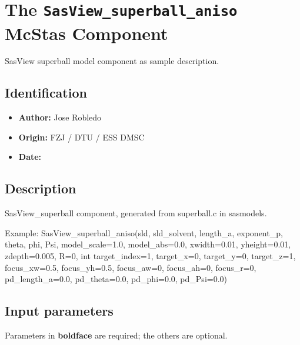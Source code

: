 \section{The \texttt{SasView\_superball\_aniso} McStas Component}
SasView superball model component as sample description.

\subsection*{Identification}
\begin{itemize}
  \item \textbf{Author:} Jose Robledo
  \item \textbf{Origin:} FZJ / DTU / ESS DMSC
  \item \textbf{Date:} 
\end{itemize}

\subsection*{Description}
SasView\_superball component, generated from superball.c in sasmodels.

Example: SasView\_superball\_aniso(sld, sld\_solvent, length\_a, exponent\_p, theta, phi, Psi, model\_scale=1.0, model\_abs=0.0, xwidth=0.01, yheight=0.01, zdepth=0.005, R=0, int target\_index=1, target\_x=0, target\_y=0, target\_z=1, focus\_xw=0.5, focus\_yh=0.5, focus\_aw=0, focus\_ah=0, focus\_r=0, pd\_length\_a=0.0, pd\_theta=0.0, pd\_phi=0.0, pd\_Psi=0.0)

\subsection*{Input parameters}
Parameters in \textbf{boldface} are required; the others are optional.

